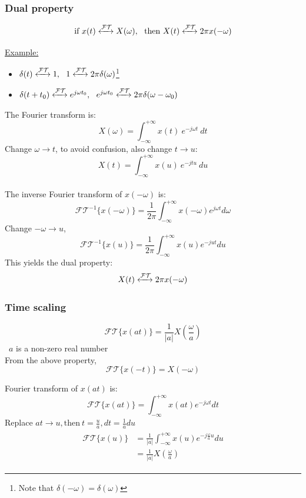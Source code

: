 \subsubsection{Dual property}
\[ \text{if} \ x(t) \xleftrightarrow{\mathcal{FT}} X(\omega), \ \ \text{then} \ X(t) \xleftrightarrow{\mathcal{FT}} 2\pi x(-\omega) \]

\underline{Example:} 
\begin{itemize}
    \item $\delta(t) \xleftrightarrow{\mathcal{FT}} 1, \ \ 1 \xleftrightarrow{\mathcal{FT}} 2\pi\delta(\omega)$\footnote{Note that $\delta(-\omega)=\delta(\omega)$}
    \item $\delta(t+t_{0})\xleftrightarrow{\mathcal{FT}}e^{j\omega t_{0}}, \ \ e^{j\omega t_{0}} \xleftrightarrow{\mathcal{FT}} 2\pi \delta(\omega-\omega_{0})$
\end{itemize}

\begin{dv}{}
    The Fourier transform is:
    \[ X(\omega) =  \int_{-\infty}^{+\infty} x(t) \ e^{-j \omega t} \ dt\] 
    Change $\omega \to t$, to avoid confusion, also change $t \to u$:
    \[ X(t) =  \int_{-\infty}^{+\infty} x(u) \ e^{-j t u} \ du \] \ \\
    The inverse Fourier transform of $x(-\omega)$ is:
    \[ \mathcal{FT}^{-1} \{ x(-\omega) \} = \frac{1}{2\pi} \int_{-\infty}^{+\infty} x(-\omega)e^{j \omega t} d\omega \]
    Change $-\omega \to u$,
    \[ \mathcal{FT}^{-1} \{ x(u) \} = \frac{1}{2\pi} \int_{-\infty}^{+\infty} x(u)e^{-jut} du \]
    This yields the dual property:
    \[ X(t) \xleftrightarrow{\mathcal{FT}} 2\pi x(-\omega) \]
\end{dv}

\subsubsection{Time scaling} 
\[ 
\mathcal{FT} \{ x(at) \} = \frac{1}{\lvert a \rvert}X(\frac{\omega}{a}) 
\]
\ $a$ is a non-zero real number\\

From the above property,
\[ 
\mathcal{FT} \{ x(-t) \} = X(-\omega) 
\]

\begin{dv}{}
    Fourier transform of $x(at)$ is:
    \[ 
    \mathcal{FT}\{x(at)\} =  \int_{-\infty}^{+\infty} x(at) e^{-j\omega t}dt 
    \]
    Replace $at \to u, \text{then} \ t = \frac{u}{a}, dt = \frac{1}{a} du$
    \begin{align*}
    \begin{split}
        \mathcal{FT}\{x(u)\} 
        &= \frac{1}{\lvert a \rvert} \int_{-\infty}^{+\infty} x(u) e^{-j \frac{\omega}{a}u}du \\
        &= \frac{1}{\lvert a \rvert} X(\frac{\omega}{a})
    \end{split}
    \end{align*} 
\end{dv}

